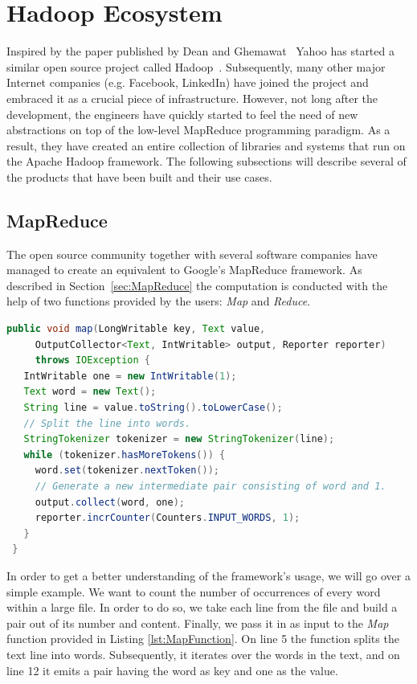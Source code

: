 \documentclass[11pt,a4paper,twoside]{report}
\begin{document}
\section{Hadoop Ecosystem}
Inspired by the paper published by Dean and Ghemawat~\cite{MapReduce} Yahoo has started a similar open source project called Hadoop~\cite{Hadoop}. Subsequently, many other major Internet companies (e.g. Facebook, LinkedIn) have joined the project and embraced it as a crucial piece of infrastructure. However, not long after the development, the engineers have quickly started to feel the need of new abstractions on top of the low-level MapReduce programming paradigm. As a result, they have created an entire collection of libraries and systems that run on the Apache Hadoop framework. The following subsections will describe several of the products that have been built and their use cases.


\subsection{MapReduce}
The open source community together with several software companies have managed to create an equivalent to Google's MapReduce framework. As described in Section~\ref{sec:MapReduce} the computation is conducted with the help of two functions provided by the users: \textit{Map} and \textit{Reduce}.\\

\begin{lstlisting}[language=Java,caption={Word Count Map Function},
label={lst:MapFunction}]
 public void map(LongWritable key, Text value,
     OutputCollector<Text, IntWritable> output, Reporter reporter)
     throws IOException {
   IntWritable one = new IntWritable(1);
   Text word = new Text();
   String line = value.toString().toLowerCase();
   // Split the line into words.
   StringTokenizer tokenizer = new StringTokenizer(line);
   while (tokenizer.hasMoreTokens()) {
     word.set(tokenizer.nextToken());
     // Generate a new intermediate pair consisting of word and 1.
     output.collect(word, one);
     reporter.incrCounter(Counters.INPUT_WORDS, 1);
   }
 }
\end{lstlisting}


In order to get a better understanding of the framework's usage, we will go over a simple example. We want to count the number of occurrences of every word within a large file. In order to do so, we take each line from the file and build a pair out of its number and content. Finally, we pass it in as input to the \textit{Map} function provided in Listing \ref{lst:MapFunction}. On line 5 the function splits the text line into words. Subsequently, it iterates over the words in the text, and on line 12 it emits a pair having the word as key and one as the value.
\end{document}
